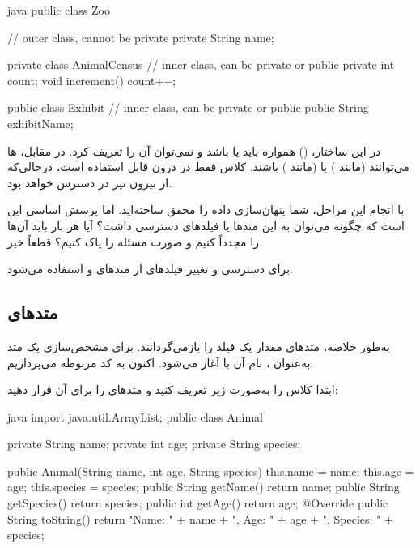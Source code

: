 \begin{codebox}{java}
public class Zoo {                     // outer class, cannot be private
    private String name;
    
    private class AnimalCensus {       // inner class, can be private or public
        private int count;
        void increment() { count++; }
    }
    
    public class Exhibit {             // inner class, can be private or public
        public String exhibitName;
    }
}
\end{codebox}

در این ساختار،  () همواره باید
 یا  باشد و نمی‌توان آن را
 تعریف کرد. در مقابل،  ها می‌توانند
 (مانند ) یا
 (مانند ) باشند. کلاس
 فقط در درون  قابل استفاده
است، درحالی‌که  از بیرون نیز در دسترس خواهد بود.

با انجام این مراحل، شما پنهان‌سازی داده را محقق ساخته‌اید. اما پرسش اساسی
این است که چگونه می‌توان به این متدها یا فیلدهای 
دسترسی داشت؟ آیا هر بار باید آن‌ها را مجدداً  کنیم و
صورت مسئله را پاک کنیم؟ قطعاً خیر.

برای دسترسی و تغییر فیلدهای  از متدهای 
و  استفاده می‌شود.

\subsection{متدهای }

به‌طور خلاصه، متدهای  مقدار یک فیلد  را
بازمی‌گردانند. برای مشخص‌سازی یک متد به‌عنوان  ، نام آن با
 آغاز می‌شود. اکنون به کد مربوطه می‌پردازیم.

ابتدا کلاس  را به‌صورت زیر تعریف کنید و متدهای
 را برای آن قرار دهید:

\begin{codebox}{java}
import java.util.ArrayList;
public class Animal {
    private String name;
    private int age;
    private String species;

    public Animal(String name, int age, String species) {
        this.name = name;
        this.age = age;
        this.species = species;
    }
    public String getName() {
        return name;
    }
    public String getSpecies() {
        return species;
    }
    public int getAge() {
        return age;
    }
    @Override
    public String toString() {
        return "Name: " + name + ", Age: " + age + ", Species: " + species;
    }
}
\end{codebox}

